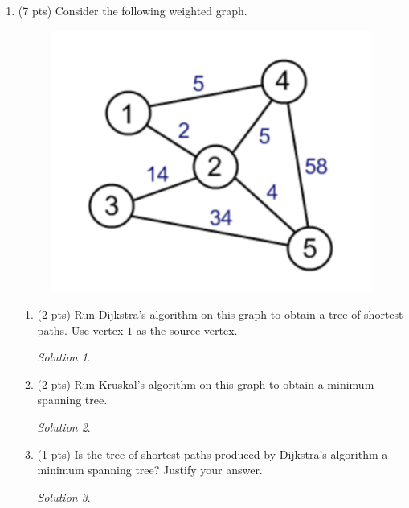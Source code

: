\documentclass[12pt]{article}
\theoremstyle{remark}
\newtheorem*{solution}{Solution}
\begin{document}
\hrulefill

\newpage
\begin{enumerate}
\item (7 pts) Consider the following weighted graph. 
\begin{figure}[h!]
\begin{center}
\includegraphics[scale=0.3]{PS5aQ1.png} 
\end{center}
\end{figure}

\begin{enumerate}[label=(\alph*)]
\item (2 pts) Run Dijkstra's algorithm on this graph to obtain a tree of shortest paths. Use vertex $1$ as the source vertex.
\begin{solution}

\end{solution}
\pagebreak


\item (2 pts) Run Kruskal's algorithm on this graph to obtain a minimum spanning tree.
\begin{solution}

\end{solution}


\item (1 pts) Is the tree of shortest paths produced by Dijkstra's algorithm a minimum spanning tree? Justify your answer.
\begin{solution}


\end{solution}
\end{enumerate}
\end{enumerate}
\end{document}
